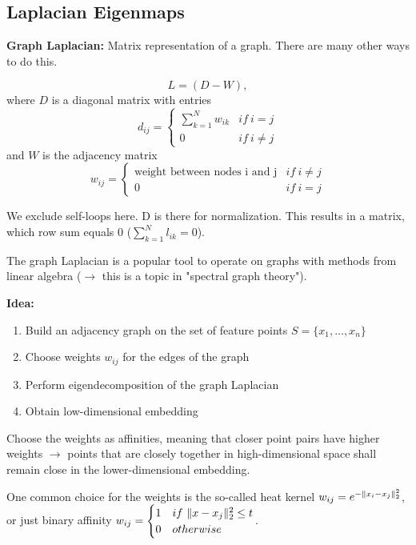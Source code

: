 \documentclass{scrartcl}
\DeclarePairedDelimiter\norm{\lVert}{\rVert}%
\begin{document}
\subsection{Laplacian Eigenmaps}
\textbf{Graph Laplacian:} Matrix representation of a graph. There are many other ways to do this.

\[L = (D - W), \]
where \(D\) is a diagonal matrix with entries \[d_{ij} = \begin{cases} \sum_{k=1}^N w_{ik} & if \ i=j \\ 0 & if \ i \neq j \end{cases}\] and \(W\) is the adjacency matrix \[w_{ij} = \begin{cases} \text{weight between nodes i and j} & if \ i\neq j \\ 0 & if \ i = j\end{cases}\]

We exclude self-loops here. D is there for normalization. This results in a matrix, which row sum equals \(0\) (\(\sum_{k=1}^N l_{ik} = 0\)).

The graph Laplacian is a popular tool to operate on graphs with methods from linear algebra (\(\rightarrow\) this is a topic in "spectral graph theory").

\bigbreak

\textbf{Idea:}
\begin{enumerate}
    \item
        Build an adjacency graph on the set of feature points \(S=\{x_1, \dots, x_n\}\) 
    \item
        Choose weights \(w_{ij}\) for the edges of the graph
    \item
        Perform eigendecomposition of the graph Laplacian
    \item
        Obtain low-dimensional embedding
\end{enumerate}
Choose the weights as affinities, meaning that closer point pairs have higher weights \(\rightarrow\) points that are closely together in high-dimensional space shall remain close in the lower-dimensional embedding.

One common choice for the weights is the so-called heat kernel \(w_{ij} = e^{-\norm{x_i - x_j}_2^2}\), or just binary affinity 
\(w_{ij} = \begin{cases} 1 & if \ \norm{x-x_j}_2^2 \leq t \\0 & otherwise \end{cases}\).

\bigbreak
\end{document}
